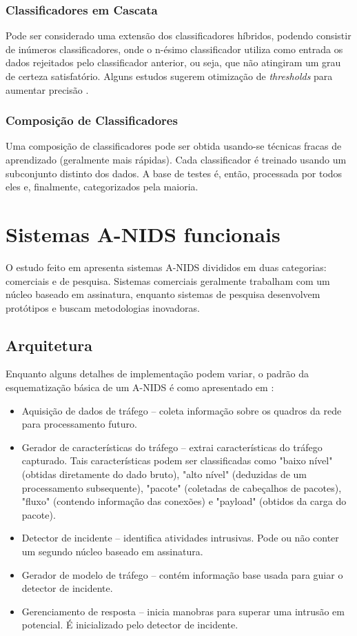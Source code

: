  \subsection{Classificadores em Cascata}
    Pode ser considerado uma extensão dos classificadores híbridos, podendo consistir de inúmeros classificadores, onde
    o n-ésimo classificador utiliza como entrada os dados rejeitados pelo classificador anterior, ou seja, que não
    atingiram um grau de certeza satisfatório. Alguns estudos sugerem otimização de \emph{thresholds} para aumentar precisão
    \cite{oliveira05}.

 \subsection{Composição de Classificadores}
    Uma composição de classificadores pode ser obtida usando-se técnicas fracas de aprendizado
    (geralmente mais rápidas). Cada classificador é treinado usando um subconjunto distinto dos dados.
    A base de testes é, então, processada por todos eles e, finalmente, categorizados pela maioria.


\chapter{Sistemas A-NIDS funcionais}
    O estudo feito em \cite{teodoro09} apresenta sistemas A-NIDS divididos em duas categorias: comerciais e de pesquisa.
    Sistemas comerciais geralmente trabalham com um núcleo baseado em assinatura, enquanto sistemas de pesquisa
    desenvolvem protótipos e buscam metodologias inovadoras.

 \section{Arquitetura}
    Enquanto alguns detalhes de implementação podem variar, o padrão da esquematização básica de um A-NIDS
    é como apresentado em \cite{catania12}:
    \begin{itemize}
        \item Aquisição de dados de tráfego -- coleta informação sobre os quadros da rede para processamento futuro.
        \item Gerador de características do tráfego -- extrai características do tráfego capturado. Tais características
         podem ser classificadas como "baixo nível" (obtidas diretamente do dado bruto), "alto nível" (deduzidas de um
         processamento subsequente), "pacote" (coletadas de cabeçalhos de pacotes), "fluxo" (contendo informação das
         conexões) e "payload" (obtidos da carga do pacote).
        \item Detector de incidente -- identifica atividades intrusivas. Pode ou não conter um segundo núcleo baseado
        em assinatura.
        \item Gerador de modelo de tráfego -- contém informação base usada para guiar o detector de incidente.
        \item Gerenciamento de resposta -- inicia manobras para superar uma intrusão em potencial. É inicializado pelo
        detector de incidente.
    \end{itemize}

